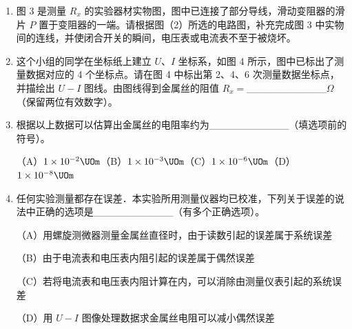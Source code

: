 \documentclass[\gkver]{gaokaozhenti}
\begin{document}
\begin{enumerate}
\begin{enumerate}
	由以上数据可知，他们测量 $R_{x}$ 是采用图 2 中的\_\_\_\_\_\_\_\_\_\_\_\_图（选填“甲”或“乙”）。

	\item
	图 3 是测量 $R_{x}$ 的实验器材实物图，图中已连接了部分导线，滑动变阻器的滑片 $P$ 置于变阻器的一端。请根据图（2）所选的电路图，补充完成图 3 中实物间的连线，并使闭合开关的瞬间，电压表或电流表不至于被烧坏。

	\item
	这个小组的同学在坐标纸上建立 $U$、$I$ 坐标系，如图 4 所示，图中已标出了测量数据对应的 4 个坐标点。请在图 4 中标出第 2、4、6 次测量数据坐标点，并描绘出 $U-I$ 图线。由图线得到金属丝的阻值 $R_{x}=$\_\_\_\_\_\_\_\_\_\_\_$\Omega$（保留两位有效数字）。

	\item
	根据以上数据可以估算出金属丝的电阻率约为\_\_\_\_\_\_\_\_\_\_\_（填选项前的符号）。

	（A）$1\times10^{-2}\UOm$\quad（B）$1\times10^{-3}\UOm$\quad（C）$1\times10^{-6}\UOm$\quad（D）$1\times10^{-8}\UOm$

	\item
	任何实验测量都存在误差．本实验所用测量仪器均已校准，下列关于误差的说法中正确的选项是\_\_\_\_\_\_\_\_\_\_\_（有多个正确选项）。

	（A）用螺旋测微器测量金属丝直径时，由于读数引起的误差属于系统误差

	（B）由于电流表和电压表内阻引起的误差属于偶然误差

	（C）若将电流表和电压表内阻计算在内，可以消除由测量仪表引起的系统误差

	（D）用 $U-I$ 图像处理数据求金属丝电阻可以减小偶然误差
\end{enumerate}
\end{enumerate}
\end{document}
